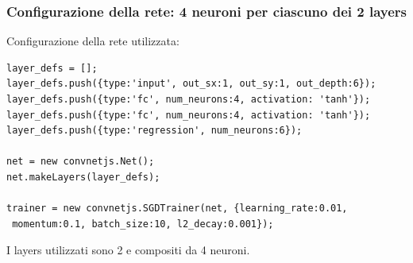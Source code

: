 \subsubsection{Configurazione della rete: 4 neuroni per ciascuno dei 2 layers}
\label{Configurazione della rete: 4 neuroni per ciascuno dei 2 layers}

Configurazione della rete utilizzata:\\
\begin{verbatim}layer_defs = [];
layer_defs.push({type:'input', out_sx:1, out_sy:1, out_depth:6});
layer_defs.push({type:'fc', num_neurons:4, activation: 'tanh'});
layer_defs.push({type:'fc', num_neurons:4, activation: 'tanh'});
layer_defs.push({type:'regression', num_neurons:6});

net = new convnetjs.Net();
net.makeLayers(layer_defs);

trainer = new convnetjs.SGDTrainer(net, {learning_rate:0.01,
 momentum:0.1, batch_size:10, l2_decay:0.001});
\end{verbatim}
\noindent
I layers utilizzati sono 2 e compositi da 4 neuroni.

